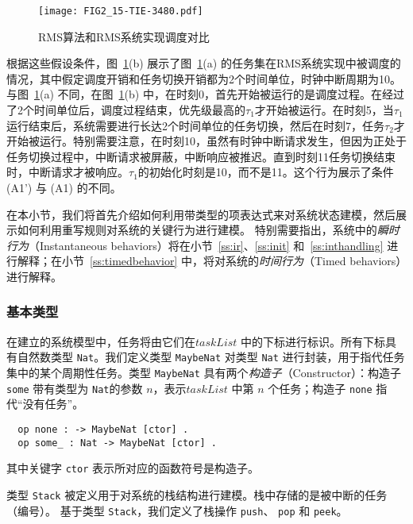 \begin{figure}[ht]
\centering
\texttt{[image: FIG2\_15-TIE-3480.pdf]}
\caption{RMS算法和RMS系统实现调度对比}
\label{f:example}
\end{figure}

根据这些假设条件，图~\ref{f:example}(b) 展示了图~\ref{f:example}(a) 的任务集在RMS系统实现中被调度的情况，其中假定调度开销和任务切换开销都为2个时间单位，时钟中断周期为10。与图~\ref{f:example}(a) 不同，在图~\ref{f:example}(b) 中，在时刻0，首先开始被运行的是调度过程。在经过了2个时间单位后，调度过程结束，优先级最高的$\tau_1$才开始被运行。在时刻5，当$\tau_1$运行结束后，系统需要进行长达2个时间单位的任务切换，然后在时刻7，任务$\tau_2$才开始被运行。特别需要注意，在时刻10，虽然有时钟中断请求发生，但因为正处于任务切换过程中，中断请求被屏蔽，中断响应被推迟。直到时刻11任务切换结束时，中断请求才被响应。$\tau_1$的初始化时刻是10，而不是11。这个行为展示了条件 (A1') 与 (A1) 的不同。

在本小节，我们将首先介绍如何利用带类型的项表达式来对系统状态建模，然后展示如何利用重写规则对系统的关键行为进行建模。
特别需要指出，系统中的\emph{瞬时行为}（Instantaneous
  behaviors）将在小节~\ref{ss:ir}、\ref{ss:init}
和~\ref{ss:inthandling} 进行解释；在小节~\ref{ss:timedbehavior} 中，将对系统的\emph{时间行为}（Timed behaviors）进行解释。

\subsubsection{基本类型}

在建立的系统模型中，任务将由它们在$\mathit{taskList}$ 中的下标进行标识。所有下标具有自然数类型 \verb|Nat|。我们定义类型 \verb|MaybeNat| 对类型 \verb|Nat| 进行封装，用于指代任务集中的某个周期性任务。类型 \verb|MaybeNat| 具有两个\emph{构造子}（Constructor）：构造子 \verb|some| 带有类型为 \verb|Nat|的参数 $n$，表示$\mathit{taskList}$ 中第 $n$ 个任务；构造子 \verb|none| 指代“没有任务”。
\begin{verbatim}
  op none : -> MaybeNat [ctor] .
  op some_ : Nat -> MaybeNat [ctor] .
\end{verbatim}
其中关键字 \verb|ctor| 表示所对应的函数符号是构造子。

类型 \verb|Stack| 被定义用于对系统的栈结构进行建模。栈中存储的是被中断的任务（编号）。
基于类型 \verb|Stack|，我们定义了栈操作
 \verb|push|、 \verb|pop| 和 \verb|peek|。

